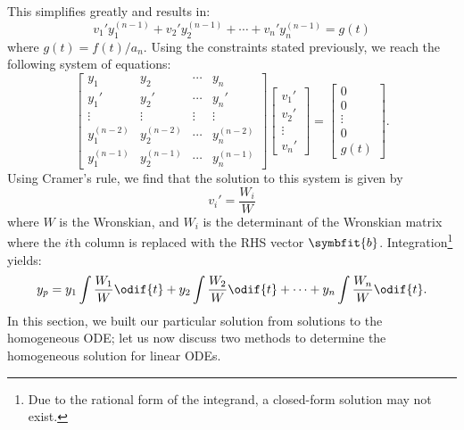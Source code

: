 \documentclass{article}
\begin{document}
This simplifies greatly and results in:
\begin{equation*}
    v_1' y_1^{\left( n-1 \right)} + v_2' y_2^{\left( n-1 \right)} + \cdots + v_n' y_n^{\left( n-1 \right)} = g\left( t \right)
\end{equation*}
where \(g\left( t \right) = f\left( t \right) / a_n\). Using the constraints stated previously, we reach the following
system of equations:
\begin{equation*}
    \begin{bmatrix}
        y_1                      & y_2                      & \cdots & y_n                      \\
        y_1'                     & y_2'                     & \cdots & y_n'                     \\
        \vdots                   & \vdots                   & \vdots & \vdots                   \\
        y_1^{\left( n-2 \right)} & y_2^{\left( n-2 \right)} & \cdots & y_n^{\left( n-2 \right)} \\
        y_1^{\left( n-1 \right)} & y_2^{\left( n-1 \right)} & \cdots & y_n^{\left( n-1 \right)}
    \end{bmatrix}
    \begin{bmatrix}
        v_1'   \\
        v_2'   \\
        \vdots \\
        v_n'
    \end{bmatrix}
    =
    \begin{bmatrix}
        0      \\
        0      \\
        \vdots \\
        0      \\
        g\left( t \right)
    \end{bmatrix}.
\end{equation*}
Using Cramer's rule, we find that the solution to this system is given by
\begin{equation*}
    v_i' = \frac{W_i}{W}
\end{equation*}
where \(W\) is the Wronskian, and \(W_i\) is the determinant of the Wronskian matrix where the \(i\)th column is replaced with the RHS vector \(\symbfit{b}\).
Integration\footnote{Due to the rational form of the integrand, a closed-form solution may not exist.} yields:
\begin{equation*}
    y_p = y_1 \int \frac{W_1}{W} \odif{t} + y_2 \int \frac{W_2}{W} \odif{t} + \cdots + y_n \int \frac{W_n}{W} \odif{t}.
\end{equation*}
In this section, we built our particular solution from solutions to the homogeneous ODE; let us now discuss two methods to determine the homogeneous solution
for linear ODEs.
\end{document}
